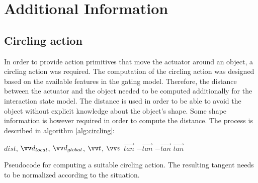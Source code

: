 \chapter{Additional Information}

\section{Circling action \label{sec:circling}}

In order to provide action primitives that move the actuator around an object, a circling action was required. The computation of the circling action was designed based on the available features in the gating model.
Therefore, the distance between the actuator and the object needed to be computed additionally for the interaction state model. The distance is used in order to be able to avoid the object without explicit knowledge about the object's shape. Some shape information is however required in order to compute the distance. 
The process is described in algorithm \ref{alg:circling}:

\begin{algorithm}
\begin{algorithmic}[1]
\Statex
{} {$dist$, $\protect\vec{d}_{local}$, $\protect\vec{d}_{global}$, $\protect\vec{t}$, $\protect\vec{v}$}
	\Else 
	\EndIf
	\State {}
\EndFunction
\Statex
{}
			\State \Return $\vec{tan}$
		\Else
			\State \Return $-\vec{tan}$
		\EndIf
	\Else
			\State \Return $-\vec{tan}$
		\Else
			\State \Return $\vec{tan}$
		\EndIf
	\EndIf
\EndFunction
\end{algorithmic}
\caption{Pseudocode for computing a suitable circling action. The resulting tangent needs to be normalized according to the situation.}
\label{alg:circling}
\end{algorithm}


